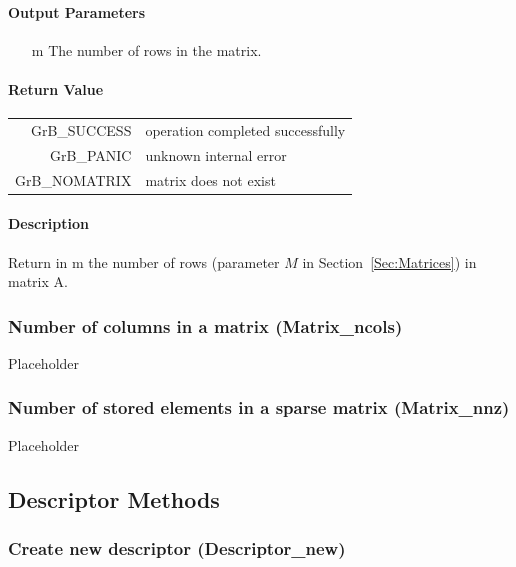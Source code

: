 \documentclass[11pt]{extarticle}
\begin{document}
\paragraph{Output Parameters}
\begin{itemize}
	\item[{\sf m}] The number of rows in the matrix.
\end{itemize}

\paragraph{Return Value}

\begin{tabular}{rl}
{\sf GrB\_SUCCESS}	& operation completed successfully \\
{\sf GrB\_PANIC}	& unknown internal error \\
{\sf GrB\_NOMATRIX}	& matrix does not exist \\
\end{tabular}

\paragraph{Description}

Return in {\sf m} the number of rows (parameter $M$ in Section~\ref{Sec:Matrices}) in matrix {\sf A}.


\subsubsection{Number of columns in a matrix ({\sf Matrix\_ncols})}

Placeholder

\subsubsection{Number of stored elements in a sparse matrix ({\sf Matrix\_nnz})}

Placeholder

\subsection{Descriptor Methods}

\subsubsection{Create new descriptor ({\sf Descriptor\_new})}
\end{document}
